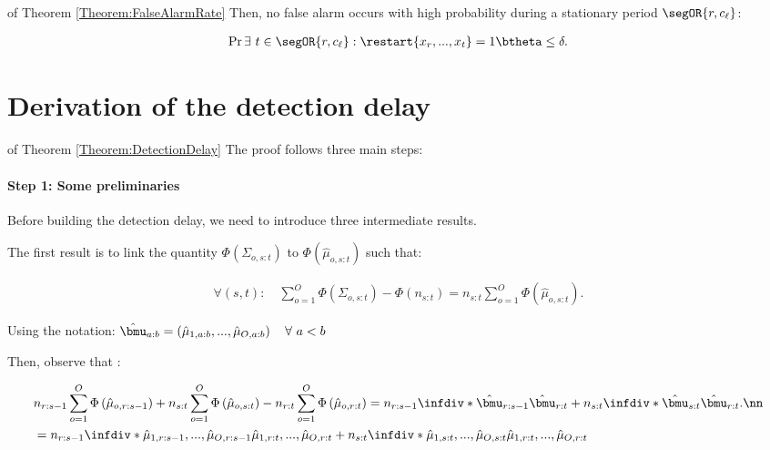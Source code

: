 \documentclass{article} %
\begin{document}
\begin{myproof}{of Theorem \ref{Theorem:FalseAlarmRate}}
Then, no false alarm occurs with high probability during a stationary period $\segOR{r, c_\ell}$: 

	\begin{align*}
	\Pr{\exists\  t \in \segOR{r, c_\ell}: \restart{x_r,...,x_t} = 1 }{\btheta} \leq  \delta.
	\end{align*}

\end{myproof}



\section{Derivation of the detection delay}



\begin{myproof}{of Theorem \ref{Theorem:DetectionDelay}}
The proof follows three main steps:
	\paragraph{Step 1: Some preliminaries}
	Before building the detection delay, we need to introduce three intermediate results. 
	
	The first result is to link the quantity $\Phi\left(\Sigma_{o,s:t} \right)$ to $\Phi\left( \hat{\mu}_{o,s:t}  \right)$ such that:
	
 \begin{align}
	\forall \left(s,t\right): \quad  \sum_{o=1}^O \Phi\left(\Sigma_{o,s:t} \right)  - \Phi\left(n_{s:t}\right) = n_{s:t}  \sum_{o=1}^O \Phi\left( \hat{\mu}_{o,s:t}  \right).
 \label{eq::Prelim}
	\end{align} 

 Using the notation: $\hat{\bmu}_{a:b} = \left(\hat{\mu}_{1,a:b},..., \hat{\mu}_{O,a:b} \right) \quad \forall \ a < b $
 
 Then, observe that :


 
	\begin{align}
	&  n_{r:s-1} \sum_{o=1}^O \Phi\left( \hat{\mu}_{o,r:s-1}  \right) + n_{s:t} \sum_{o=1}^O \Phi\left( \hat{\mu}_{o,s:t} \right) 
	- n_{r:t} \sum_{o=1}^O \Phi\left( \hat{\mu}_{o,r:t}  \right)   = n_{r:s-1} \infdiv*{\hat{\bmu}_{r:s-1}}{\hat{\bmu}_{r:t}} + n_{s:t} \infdiv*{\hat{\bmu}_{s:t}}{\hat{\bmu}_{r:t}}.\nn  \\
 &  = n_{r:s-1} \infdiv*{\hat{\mu}_{1,r:s-1},..., \hat{\mu}_{O,r:s-1}}{\hat{\mu}_{1,r:t},...,\hat{\mu}_{O,r:t}} + n_{s:t} \infdiv*{\hat{\mu}_{1,s:t},...,\hat{\mu}_{O,s:t}}{\hat{\mu}_{1,r:t},..., \hat{\mu}_{O,r:t}}  \label{EqKL}
	\end{align}


\end{myproof}
\end{document}
